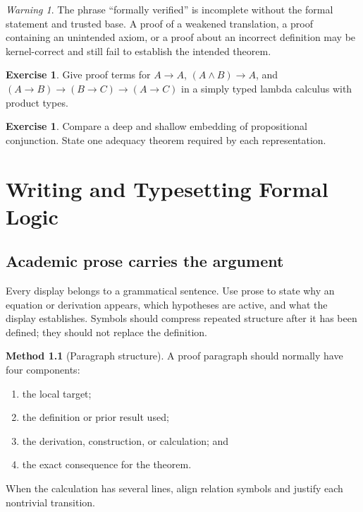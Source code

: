\documentclass[11pt,oneside,openany]{book}
\theoremstyle{definition}
\newtheorem{exercise}[definition]{Exercise}
\newtheorem{method}[definition]{Method}
\theoremstyle{plain}
\theoremstyle{remark}
\newtheorem{warning}[definition]{Warning}
\begin{document}
\begin{warning}
The phrase ``formally verified'' is incomplete without the formal statement and
trusted base.  A proof of a weakened translation, a proof containing an
unintended axiom, or a proof about an incorrect definition may be kernel-correct
and still fail to establish the intended theorem.
\end{warning}

\begin{exercise}
\label{ex:mechanization-01}
Give proof terms for \(A\to A\),
\((A\land B)\to A\), and
\((A\to B)\to(B\to C)\to(A\to C)\) in a simply typed lambda calculus with
product types.
\end{exercise}

\begin{exercise}
\label{ex:mechanization-02}
Compare a deep and shallow embedding of propositional conjunction.  State one
adequacy theorem required by each representation.
\end{exercise}

\chapter{Writing and Typesetting Formal Logic}
\label{ch:latex-style}

\section{Academic prose carries the argument}
\label{sec:latex-style-01}

Every display belongs to a grammatical sentence.  Use prose to state why an
equation or derivation appears, which hypotheses are active, and what the
display establishes.  Symbols should compress repeated structure after it has
been defined; they should not replace the definition.

\begin{method}[Paragraph structure]
A proof paragraph should normally have four components:
\begin{enumerate}
  \item the local target;
  \item the definition or prior result used;
  \item the derivation, construction, or calculation; and
  \item the exact consequence for the theorem.
\end{enumerate}
When the calculation has several lines, align relation symbols and justify each
nontrivial transition.
\end{method}
\end{document}
